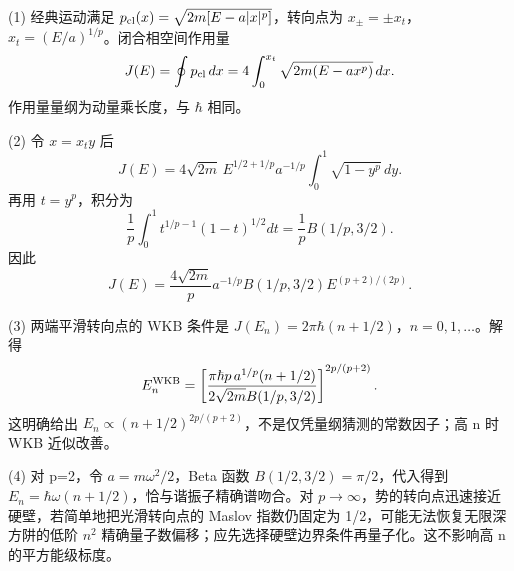 (1) 经典运动满足 \(p_{\rm cl}(x)=\sqrt{2m[E-a|x|^p]}\)，转向点为 \(x_\pm=\pm x_t\)，\(x_t=(E/a)^{1/p}\)。闭合相空间作用量
\[
J(E)=\oint p_{\rm cl}\,dx
=4\int_0^{x_t}\sqrt{2m(E-ax^p)}\,dx.
\]
作用量量纲为动量乘长度，与 \(\hbar \) 相同。

(2) 令 \(x=x_ty\) 后
\[
J(E)=4\sqrt{2m}\,E^{1/2+1/p}a^{-1/p}
\int_0^1\sqrt{1-y^p}\,dy.
\]
再用 \(t=y^p\)，积分为
\[
\frac1p\int_0^1t^{1/p-1}(1-t)^{1/2}dt
=\frac1p B(1/p,3/2).
\]
因此
\[
J(E)=\frac{4\sqrt{2m}}p a^{-1/p}B(1/p,3/2)
E^{(p+2)/(2p)}.
\]

(3) 两端平滑转向点的 WKB 条件是 \(J(E_n)=2\pi\hbar(n+1/2)\)，\(n=0,1,\dots\)。解得
\[
E_n^{\rm WKB}=
\left[\frac{\pi\hbar p\,a^{1/p}(n+1/2)}
{2\sqrt{2m}B(1/p,3/2)}\right]^{2p/(p+2)}.
\]
这明确给出 \(E_n\propto(n+1/2)^{2p/(p+2)}\)，不是仅凭量纲猜测的常数因子；高 n 时 WKB 近似改善。

(4) 对 p=2，令 \(a=m\omega^2/2\)，Beta 函数 \(B(1/2,3/2)=\pi/2\)，代入得到 \(E_n=\hbar\omega(n+1/2)\)，恰与谐振子精确谱吻合。对 \(p\to \infty \)，势的转向点迅速接近硬壁，若简单地把光滑转向点的 Maslov 指数仍固定为 1/2，可能无法恢复无限深方阱的低阶 \(n^2\) 精确量子数偏移；应先选择硬壁边界条件再量子化。这不影响高 n 的平方能级标度。
